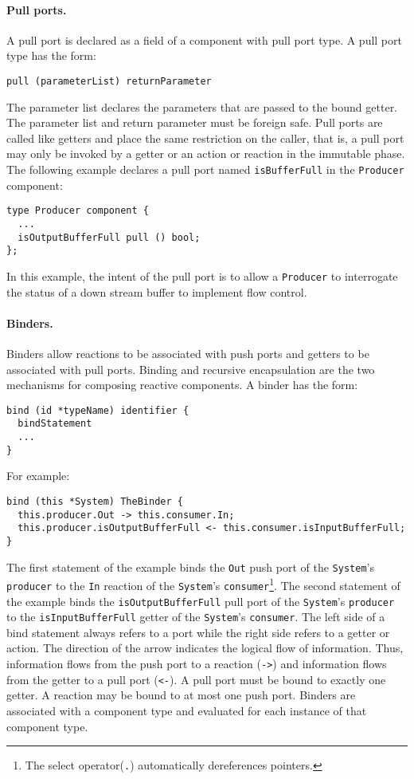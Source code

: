 \paragraph{Pull ports.}
A pull port is declared as a field of a component with pull port type.
A pull port type has the form:
\begin{verbatim}
pull (parameterList) returnParameter
\end{verbatim}
The parameter list declares the parameters that are passed to the bound getter.
The parameter list and return parameter must be foreign safe.
Pull ports are called like getters and place the same restriction on the caller, that is, a pull port may only be invoked by a getter or an action or reaction in the immutable phase.
The following example declares a pull port named \verb+isBufferFull+ in the \verb+Producer+ component:
\begin{verbatim}
type Producer component {
  ...
  isOutputBufferFull pull () bool;
};
\end{verbatim}
In this example, the intent of the pull port is to allow a \verb+Producer+ to interrogate the status of a down stream buffer to implement flow control.

\paragraph{Binders.}
Binders allow reactions to be associated with push ports and getters to be associated with pull ports.
Binding and recursive encapsulation are the two mechanisms for composing reactive components.
A binder has the form:
\begin{verbatim}
bind (id *typeName) identifier {
  bindStatement
  ...
}
\end{verbatim}
For example:
\begin{verbatim}
bind (this *System) TheBinder {
  this.producer.Out -> this.consumer.In;
  this.producer.isOutputBufferFull <- this.consumer.isInputBufferFull;
}
\end{verbatim}
The first statement of the example binds the \verb+Out+ push port of the \verb+System+'s \verb+producer+ to the \verb+In+ reaction of the \verb+System+'s \verb+consumer+\footnote{The select operator(\texttt{.}) automatically dereferences pointers.}.
The second statement of the example binds the \verb+isOutputBufferFull+ pull port of the \verb+System+'s \verb+producer+ to the \verb+isInputBufferFull+ getter of the \verb+System+'s \verb+consumer+.
The left side of a bind statement always refers to a port while the right side refers to a getter or action.
The direction of the arrow indicates the logical flow of information.
Thus, information flows from the push port to a reaction (\verb+->+) and information flows from the getter to a pull port (\verb+<-+).
A pull port must be bound to exactly one getter.
A reaction may be bound to at most one push port.
Binders are associated with a component type and evaluated for each instance of that component type.

